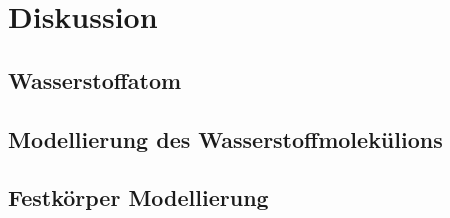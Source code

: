 \section{Diskussion}
\label{sec:diskussion}

\subsection{Wasserstoffatom}
\subsection{Modellierung des Wasserstoffmolekülions}
\subsection{Festkörper Modellierung}